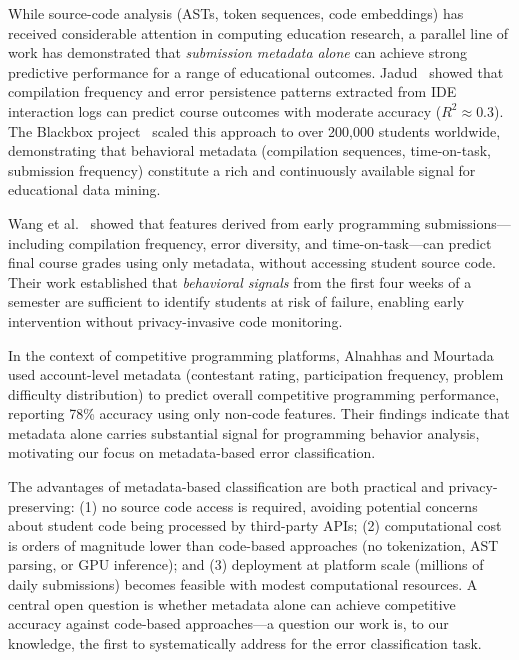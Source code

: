 \documentclass[acmsmall]{acmart}
\begin{document}
While source-code analysis (ASTs, token sequences, code embeddings) has
received considerable attention in computing education research, a parallel
line of work has demonstrated that \textit{submission metadata alone} can
achieve strong predictive performance for a range of educational outcomes.
Jadud~\cite{jadud2006methods} showed that compilation frequency and
error persistence patterns extracted from IDE interaction logs can predict
course outcomes with moderate accuracy ($R^2 \approx 0.3$). The Blackbox
project~\cite{brown2014blackbox} scaled this approach to over 200,000
students worldwide, demonstrating that behavioral metadata (compilation
sequences, time-on-task, submission frequency) constitute a rich and
continuously available signal for educational data mining.

Wang et al.~\cite{wang2017learning} showed that features derived from early
programming submissions---including compilation frequency, error diversity,
and time-on-task---can predict final course grades using only metadata,
without accessing student source code. Their work established that
\textit{behavioral signals} from the first four weeks of a semester
are sufficient to identify students at risk of failure, enabling early
intervention without privacy-invasive code monitoring.

In the context of competitive programming platforms, Alnahhas and
Mourtada~\cite{alnahhas2020predicting} used account-level metadata (contestant
rating, participation frequency, problem difficulty distribution) to predict
overall competitive programming performance, reporting 78\% accuracy using
only non-code features. Their findings indicate that metadata alone carries
substantial signal for programming behavior analysis, motivating our focus on
metadata-based error classification.

The advantages of metadata-based classification are both practical and
privacy-preserving: (1) no source code access is required, avoiding
potential concerns about student code being processed by third-party APIs;
(2) computational cost is orders of magnitude lower than code-based
approaches (no tokenization, AST parsing, or GPU inference); and
(3) deployment at platform scale (millions of daily submissions) becomes
feasible with modest computational resources. A central open question
is whether metadata alone can achieve competitive accuracy against
code-based approaches---a question our work is, to our knowledge, the first to
systematically
address for the error classification task.
\end{document}
